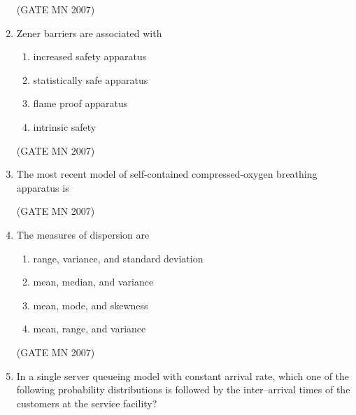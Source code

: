 \documentclass[journal]{IEEEtran}
\begin{document}
\begin{enumerate}
\hfill (GATE MN 2007)

\item Zener barriers are associated with
\begin{enumerate}
		
    \item increased safety apparatus
    \item statistically safe apparatus
    \item flame proof apparatus
    \item intrinsic safety
	    
\end{enumerate}

\hfill (GATE MN 2007)

\item The most recent model of self-contained compressed-oxygen breathing apparatus is
\begin{enumerate}
\end{enumerate}

\hfill (GATE MN 2007)


\item The measures of dispersion are

\begin{enumerate}
    \item range, variance, and standard deviation
    \item mean, median, and variance
    \item mean, mode, and skewness
    \item mean, range, and variance

\end{enumerate}

 \hfill (GATE MN 2007)

\item In a single server queueing model with constant arrival rate, which one of the following probability distributions is followed by the inter–arrival times of the customers at the service facility?
\begin{enumerate}
\end{enumerate}



\end{enumerate}
\end{document}

